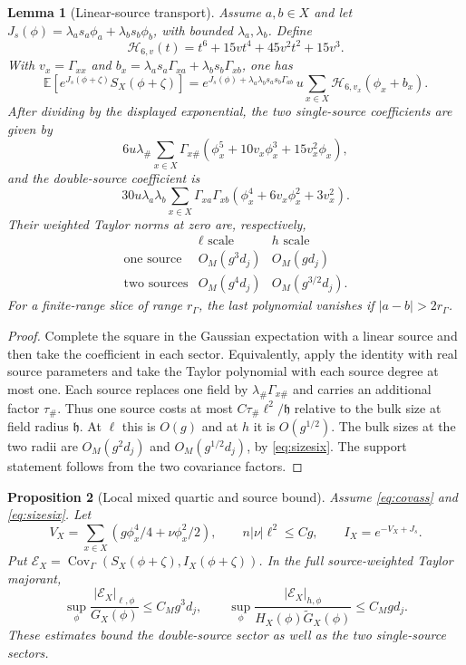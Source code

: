 \documentclass[11pt]{article}
\newtheorem{proposition}{Proposition}[section]
\newtheorem{lemma}[proposition]{Lemma}
\newcommand{\E}{\mathbb E}
\newcommand{\Cov}{\operatorname{Cov}}
\begin{document}
\begin{lemma}[Linear-source transport]\label{lem:wick}
Assume \(a,b\in X\) and let \(J_s(\phi)=\lambda_a s_a\phi_a+\lambda_b s_b\phi_b\), with bounded \(\lambda_a,\lambda_b\). Define
\[
 \mathcal H_{6,v}(t)=t^6+15vt^4+45v^2t^2+15v^3 .
\]
With \(v_x=\Gamma_{xx}\) and \(b_x=\lambda_a s_a\Gamma_{xa}+\lambda_b s_b\Gamma_{xb}\), one has
\begin{equation}\label{eq:wickshift}
 \E\left[e^{J_s(\phi+\zeta)} S_X(\phi+\zeta)\right]
 = e^{J_s(\phi)+\lambda_a\lambda_b s_as_b\Gamma_{ab}}\,
       u\sum_{x\in X}\mathcal H_{6,v_x}(\phi_x+b_x).
\end{equation}
After dividing by the displayed exponential, the two single-source coefficients are given by
\[
 6u\lambda_\#\sum_{x\in X}\Gamma_{x\#}
             (\phi_x^5+10v_x\phi_x^3+15v_x^2\phi_x),
\]
and the double-source coefficient is
\[
 30u\lambda_a\lambda_b\sum_{x\in X}\Gamma_{xa}\Gamma_{xb}
             (\phi_x^4+6v_x\phi_x^2+3v_x^2).
\]
Their weighted Taylor norms at zero are, respectively,
\[
 \begin{array}{c|cc}
  & \ell\text{ scale} & h\text{ scale}\\ \hline
  \text{one source}&O_M(g^3d_j)&O_M(gd_j)\\
  \text{two sources}&O_M(g^4d_j)&O_M(g^{3/2}d_j).
 \end{array}
\]
For a finite-range slice of range \(r_\Gamma\), the last polynomial vanishes if \(|a-b|>2r_\Gamma\).
\end{lemma}

\begin{proof}
Complete the square in the Gaussian expectation with a linear source and then take the coefficient in each sector. Equivalently, apply the identity with real source parameters and take the Taylor polynomial with each source degree at most one. Each source replaces one field by \(\lambda_\#\Gamma_{x\#}\) and carries an additional factor \(\tau_\#\). Thus one source costs at most \(C\tau_\#\ell^2/\mathfrak h\) relative to the bulk size at field radius \(\mathfrak h\). At \(\ell\) this is \(O(g)\) and at \(h\) it is \(O(g^{1/2})\). The bulk sizes at the two radii are \(O_M(g^2d_j)\) and \(O_M(g^{1/2}d_j)\), by \eqref{eq:sizesix}. The support statement follows from the two covariance factors.
\end{proof}

\begin{proposition}[Local mixed quartic and source bound]\label{prop:mixed}
Assume \eqref{eq:covass} and \eqref{eq:sizesix}. Let
\[
 V_X=\sum_{x\in X}(g\phi_x^4/4+\nu\phi_x^2/2),\qquad
 n|\nu|\ell^2\le Cg,\qquad I_X=e^{-V_X+J_s}.
\]
Put \(\mathcal E_X=\Cov_\Gamma(S_X(\phi+\zeta), I_X(\phi+\zeta))\).
In the full source-weighted Taylor majorant,
\[
 \sup_\phi \frac{|\mathcal E_X|_{\ell,\phi}}{G_X(\phi)}
 \le C_M g^3d_j,\qquad
 \sup_\phi \frac{|\mathcal E_X|_{h,\phi}}{H_X(\phi)\widetilde G_X(\phi)}
 \le C_M gd_j.
\]
These estimates bound the double-source sector as well as the two single-source sectors.
\end{proposition}
\end{document}
